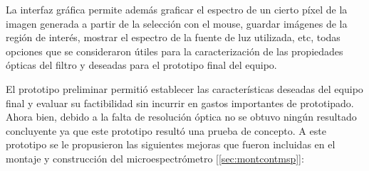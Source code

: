 La interfaz gráfica permite además graficar el espectro de un cierto píxel de la imagen generada a partir de la selección con el mouse, guardar imágenes de la región de interés, mostrar el espectro de la fuente de luz utilizada, etc, todas opciones que se consideraron útiles para la caracterización de las propiedades ópticas del filtro y deseadas para el prototipo final del equipo.

El prototipo preliminar permitió establecer las características deseadas del equipo final y evaluar su factibilidad sin incurrir en gastos importantes de prototipado. Ahora bien, debido a la falta de resolución óptica no se obtuvo ningún resultado concluyente ya que este prototipo resultó una prueba de concepto. A este prototipo se le propusieron las siguientes mejoras que fueron incluidas en el montaje y construcción del microespectrómetro [\ref{sec:montcontmsp}]:

